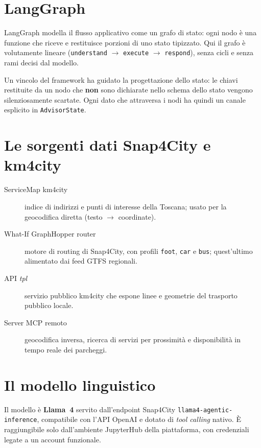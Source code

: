 \documentclass[a4paper,oneside]{Tptesi2}
\begin{document}
\section{LangGraph}

LangGraph \cite{langgraph} modella il flusso applicativo come un grafo di stato: ogni
nodo \`e una funzione che riceve e restituisce porzioni di uno stato tipizzato. Qui il
grafo \`e volutamente lineare (\texttt{understand} $\rightarrow$ \texttt{execute}
$\rightarrow$ \texttt{respond}), senza cicli e senza rami decisi dal modello.

Un vincolo del framework ha guidato la progettazione dello stato: le chiavi restituite
da un nodo che \textbf{non} sono dichiarate nello schema dello stato vengono
silenziosamente scartate. Ogni dato che attraversa i nodi ha quindi un canale
esplicito in \texttt{AdvisorState}.

\section{Le sorgenti dati Snap4City e km4city}

\begin{description}
  \item[ServiceMap km4city] indice di indirizzi e punti di interesse della Toscana;
        usato per la geocodifica diretta (testo $\rightarrow$ coordinate).
  \item[What-If GraphHopper router] motore di routing di Snap4City, con profili
        \texttt{foot}, \texttt{car} e \texttt{bus}; quest'ultimo alimentato dai feed
        GTFS regionali.
  \item[API \emph{tpl}] servizio pubblico km4city che espone linee e geometrie del
        trasporto pubblico locale.
  \item[Server MCP remoto] geocodifica inversa, ricerca di servizi per prossimit\`a e
        disponibilit\`a in tempo reale dei parcheggi.
\end{description}

\section{Il modello linguistico}

Il modello \`e \textbf{Llama~4} servito dall'endpoint Snap4City
\texttt{llama4-agentic-inference}, compatibile con l'API OpenAI e dotato di
\emph{tool calling} nativo. \`E raggiungibile solo dall'ambiente JupyterHub della
piattaforma, con credenziali legate a un account funzionale.
\end{document}
